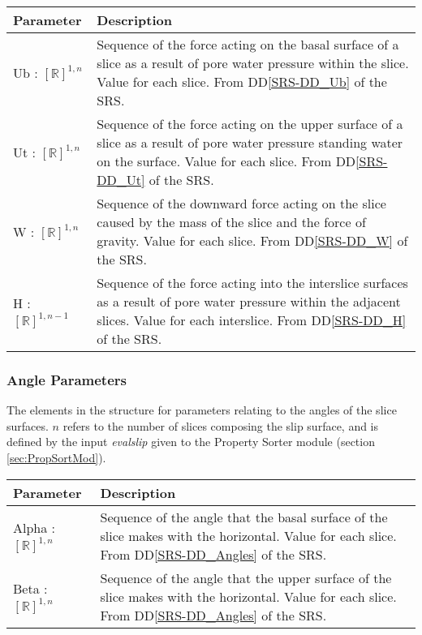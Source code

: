 \documentclass[12pt, titlepage]{article}
\begin{document}
\begin{center}
\begin{longtable}{ p{} 
    p{}}\hline 

  \textbf{Parameter} & \textbf{Description}\\ \hline

  Ub : $[\mathbb{R}]^{1,n}$ & Sequence of the force acting on the
  basal surface of a slice as a result of pore water pressure within
  the slice. Value for each slice. From DD\ref{SRS-DD_Ub} of the
  SRS.\\
  
  Ut : $[\mathbb{R}]^{1,n}$ & Sequence of the force acting on the
  upper surface of a slice as a result of pore water pressure standing
  water on the surface. Value for each slice. From DD\ref{SRS-DD_Ut}
  of the SRS.\\

  W : $[\mathbb{R}]^{1,n}$ & Sequence of the downward force acting on
  the slice caused by the mass of the slice and the force of
  gravity. Value for each slice. From DD\ref{SRS-DD_W} of the SRS.\\

  H : $[\mathbb{R}]^{1,n-1}$ & Sequence of the force acting into the
  interslice surfaces as a result of pore water pressure within the
  adjacent slices. Value for each interslice. From DD\ref{SRS-DD_H} of
  the SRS.\\
\end{longtable}
\end{center}

\subsubsection{Angle Parameters} \label{Tbl:AngleParam}
\noindent
The elements in the structure for parameters relating to the angles of
the slice surfaces. $n$ refers to the number of slices composing the
slip surface, and is defined by the input \textit{evalslip} given to
the Property Sorter module (section \ref{sec:PropSortMod}).

\begin{center}
\begin{longtable}{ p{}
    p{}}\hline 
  \textbf{Parameter} & \textbf{Description}\\ \hline

  Alpha : $[\mathbb{R}]^{1,n}$ & Sequence of the angle that the basal
  surface of the slice makes with the horizontal. Value for each
  slice. From DD\ref{SRS-DD_Angles} of the SRS.\\

  Beta : $[\mathbb{R}]^{1,n}$ & Sequence of the angle that the upper
  surface of the slice makes with the horizontal. Value for each
  slice. From DD\ref{SRS-DD_Angles} of the SRS.\\ \hline
\end{longtable}
\end{center}
\end{document}
